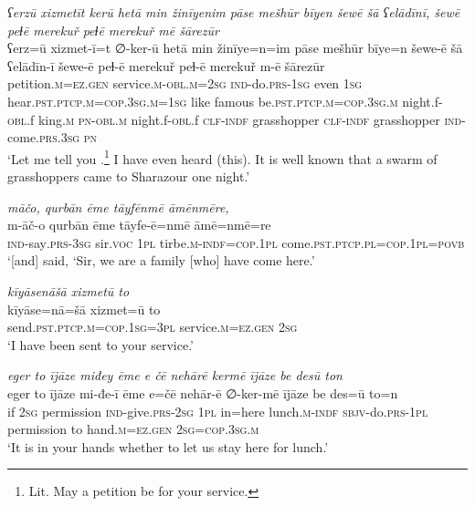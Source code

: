 \ea \label{PM.1}
\textit{ʕerzū xizmetīt kerū hetā min žinīyenim pāse mešhūr bīyen šewē šā ʕelādīnī, šewē peɫē merekuř peɫē merekuř mē šārezūr} \\ 
\gll ʕerz=ū xizmet-ī=t ∅-ker-ū hetā min žinīye=n=im pāse mešhūr bīye=n šewe-ē šā ʕelādīn-ī šewe-ē peɫ-ē merekuř peɫ-ē merekuř m-ē šārezūr \\ 
 petition\textsc{.m}\textsc{\textsc{=ez.gen}} service\textsc{.m}\textsc{-obl}\textsc{.m}\textsc{=\textsc{2sg}} \textsc{ind-}do\textsc{.prs}\textsc{-\textsc{1sg}} even \textsc{1sg} hear\textsc{.pst}\textsc{.ptcp}\textsc{.m}\textsc{=cop}\textsc{.3sg}\textsc{.m}\textsc{=\textsc{1sg}} like famous be\textsc{.pst}\textsc{.ptcp}\textsc{.m}\textsc{=cop}\textsc{.3sg}\textsc{.m} night.f\textsc{-obl}.f king\textsc{.m} \textsc{pn}\textsc{-obl}\textsc{.m} night.f\textsc{-obl}.f \textsc{clf}\textsc{-indf} grasshopper \textsc{clf}\textsc{-indf} grasshopper \textsc{ind-}come\textsc{.prs}\textsc{.3sg} \textsc{pn} \\ 
\glt `Let me tell you .\footnote{Lit. May a petition be for your service.} I have even heard (this). It is well known that a swarm of grasshoppers came to Sharazour one night.'
\z 
 
\ea \label{PM.11}
\textit{māčo, qurbān ēme tāyfēnmē āmēnmēre,} \\ 
\gll m-āč-o qurbān ēme tāyfe-ē=nmē āmē=nmē=re \\ 
 \textsc{ind-}say\textsc{.prs}\textsc{-3sg} sir.\textsc{voc} \textsc{1pl} tirbe\textsc{.m}\textsc{-indf}\textsc{=cop}\textsc{.1pl} come\textsc{.pst}\textsc{.ptcp}\textsc{.pl}\textsc{=cop}\textsc{.1pl}\textsc{=\textsc{povb}} \\ 
\glt `[and] said, ‘Sir, we are a family [who] have come here.'
\z 
 
\ea \label{PM.13}
\textit{kīyāsenāšā xizmetū to} \\ 
\gll kīyāse=nā=šā xizmet=ū to \\ 
 send\textsc{.pst}\textsc{.ptcp}\textsc{.m}\textsc{=cop}\textsc{.\textsc{1sg}}\textsc{=3pl} service\textsc{.m}\textsc{\textsc{=ez.gen}} \textsc{2sg} \\ 
\glt `I have been sent to your service.'
\z 
 
\ea \label{PM.14}
\textit{eger to ījāze miđey ēme e čē nehārē kermē ījāze be desū ton} \\ 
\gll eger to ījāze mi-đe-ī ēme e=čē nehār-ē ∅-ker-mē ījāze be des=ū to=n \\ 
 if \textsc{2sg} permission \textsc{ind-}give\textsc{.prs}-\textsc{2sg} \textsc{1pl} in=here lunch\textsc{.m}\textsc{-indf} \textsc{sbjv-}do\textsc{.prs}\textsc{-1pl} permission to hand\textsc{.m}\textsc{\textsc{=ez.gen}} \textsc{2sg}\textsc{=cop}\textsc{.3sg}\textsc{.m} \\ 
\glt `It is in your hands whether to let us stay here for lunch.'
\z 
 

